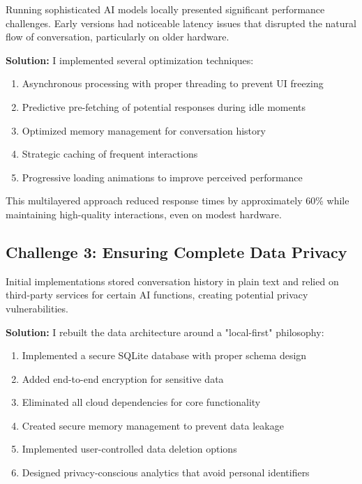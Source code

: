 \documentclass[12pt]{article}
\begin{document}
Running sophisticated AI models locally presented significant performance challenges. Early versions had noticeable latency issues that disrupted the natural flow of conversation, particularly on older hardware.

\textbf{Solution:} I implemented several optimization techniques:

\begin{enumerate}
    \item Asynchronous processing with proper threading to prevent UI freezing
    \item Predictive pre-fetching of potential responses during idle moments
    \item Optimized memory management for conversation history
    \item Strategic caching of frequent interactions
    \item Progressive loading animations to improve perceived performance
\end{enumerate}

This multilayered approach reduced response times by approximately 60\% while maintaining high-quality interactions, even on modest hardware.

\subsection{Challenge 3: Ensuring Complete Data Privacy}

Initial implementations stored conversation history in plain text and relied on third-party services for certain AI functions, creating potential privacy vulnerabilities.

\textbf{Solution:} I rebuilt the data architecture around a "local-first" philosophy:

\begin{enumerate}
    \item Implemented a secure SQLite database with proper schema design
    \item Added end-to-end encryption for sensitive data
    \item Eliminated all cloud dependencies for core functionality
    \item Created secure memory management to prevent data leakage
    \item Implemented user-controlled data deletion options
    \item Designed privacy-conscious analytics that avoid personal identifiers
\end{enumerate}
\end{document}
